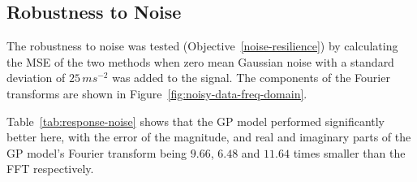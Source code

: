 \documentclass[12pt]{article}
\begin{document}
    \subsection{Robustness to Noise}
    The robustness to noise was tested (Objective~\ref{noise-resilience}) by calculating the MSE of the two methods when zero mean Gaussian noise with a standard deviation of $25 \, ms^{-2}$ was added to the signal.
    The components of the Fourier transforms are shown in Figure~\ref{fig:noisy-data-freq-domain}.


    Table~\ref{tab:response-noise} shows that the GP model performed significantly better here, with the error of the magnitude, and real and imaginary parts of the GP model's Fourier transform being $9.66$, $6.48$ and $11.64$ times smaller than the FFT respectively.
\end{document}
